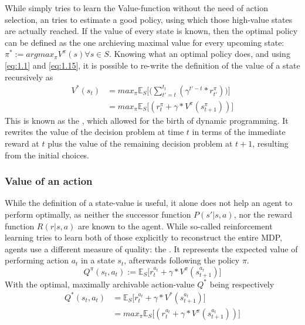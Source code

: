 While  simply tries to learn the Value-function without the need of action selection, an  tries to estimate a good policy, using which those high-value states are actually reached. If the value of every state is known, then the optimal policy can be defined as the one archieving maximal value for every upcoming state: \mbox{$\pi^* := argmax_\pi V^\pi(s) \forall s \in S$}. Knowing what an optimal policy does, and using \ref{eq:1.1} and \ref{eq:1.15}, it is possible to re-write the definition of the value of a state recursively as 
\begin{align}
	V^*(s_t) &= max_\pi \mathds{E}_S \Big[ \big(\sum_{t'=t}^{t_t} ( \gamma^{t'-t} * r^\pi_{t'} )\big) \Big] \label{eq:1.16}\\
	&= max_\pi  \mathds{E}_S \big[ (r^\pi_t + \gamma * V^\pi(s_{t+1}^\pi)) \big] 
\end{align}
This is known as the , which allowed for the birth of dynamic programming. It rewrites the value of the decision problem at time $t$ in terms of the immediate reward at $t$ plus the value of the remaining decision problem at $t+1$, resulting from the initial choices.

\subsubsection{Value of an action}
While the definition of a state-value is useful, it alone does not help an agent to perform optimally, as neither the successor function $P(s'|s,a)$, nor the reward function $R(r|s,a)$ are known to the agent. While so-called  reinforcement learning tries to learn both of those explicitly to reconstruct the entire MDP,  agents use a different measure of quality: the . It represents the expected value of performing action $a_t$ in a state $s_t$, afterwards following the policy $\pi$.
\begin{equation} \label{eq:1.2}
	Q^\pi(s_t,a_t) :=  \mathds{E}_S \big[ r_t^{a_t} + \gamma * V^\pi(s_{t+1}^{a_t}) \big]
\end{equation}
With the optimal, maximally archivable action-value $Q^*$ being respectively
\begin{align}
	Q^*(s_t,a_t) &=  \mathds{E}_S \big[ r_t^{a_t} + \gamma * V^*(s_{t+1}^{a_t}) \big] \\
	&= max_\pi \mathds{E}_S \big[ ( r_t^{a_t} + \gamma * V^\pi(s_{t+1}^{a_t})) \big]
\end{align}

